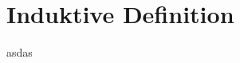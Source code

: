 \documentclass[12pt]{article}
\begin{document}
    \section*{Induktive Definition}
    asdas
\end{document}
